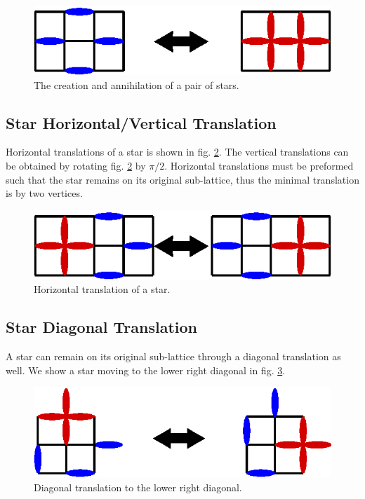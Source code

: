 \documentclass[aps,floatfix,11pt]{revtex4-1}
\begin{document}
\begin{figure}[h]
    \centering
    \includegraphics[width=8.5 cm]{create_annihilate_pair}
    \caption{The creation and annihilation of a pair of stars.
\label{fig:create_annihilate_pair}}
\end{figure}

\subsection{Star Horizontal/Vertical Translation}
Horizontal translations of a star is shown in fig. \ref{fig:move_right_left}. The vertical
translations can be obtained by rotating fig. \ref{fig:move_right_left} by $\pi/2$. Horizontal
translations must be preformed such that the star remains on its original sub-lattice, thus the
minimal translation is by two vertices.

\begin{figure}[h]
    \centering
    \includegraphics[width=8.5 cm]{move_right_left}
    \caption{Horizontal translation of a star.
\label{fig:move_right_left}}
\end{figure}


\subsection{Star Diagonal Translation}
A star can remain on its original sub-lattice through a diagonal translation as well. We show a star moving
to the lower right diagonal in fig. \ref{fig:diag}. 
\begin{figure}[h]
    \centering
    \includegraphics[width=8.5 cm]{diag}
    \caption{Diagonal translation to the lower right diagonal.
\label{fig:diag}}
\end{figure}
\end{document}
